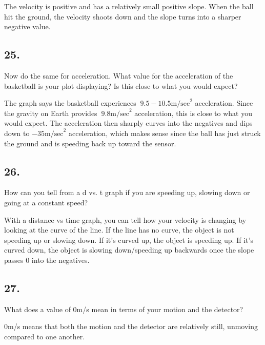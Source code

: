     \begin{mdframed}
        The velocity is positive and has a relatively small positive slope. When the ball hit the ground, the velocity shoots down and the slope turns into a sharper negative value.
    \end{mdframed}

    \subsection*{25.}
    Now do the same for acceleration. What value for the acceleration of the basketball is your plot displaying? Is this close to what you would expect?

    \begin{mdframed}
        The graph says the basketball experiences $~9.5-10.5 \text{m/sec}^2$ acceleration. Since the gravity on Earth provides $~9.8 \text{m/sec}^2$ acceleration, this is close to what you would expect. The acceleration then sharply curves into the negatives and dips down to $-35 \text{m/sec}^2$ acceleration, which makes sense since the ball has just struck the ground and is speeding back up toward the sensor.
    \end{mdframed}

    \subsection*{26.}
    How can you tell from a d vs. t graph if you are speeding up, slowing down or going at a constant speed?

    \begin{mdframed}
        With a distance vs time graph, you can tell how your velocity is changing by looking at the curve of the line. If the line has no curve, the object is not speeding up or slowing down. If it's curved up, the object is speeding up. If it's curved down, the object is slowing down/speeding up backwards once the slope passes 0 into the negatives.
    \end{mdframed}

    \subsection*{27.}
    What does a value of 0m/s mean in terms of your motion and the detector? 

    \begin{mdframed}
        0m/s means that both the motion and the detector are relatively still, unmoving compared to one another.
    \end{mdframed}

